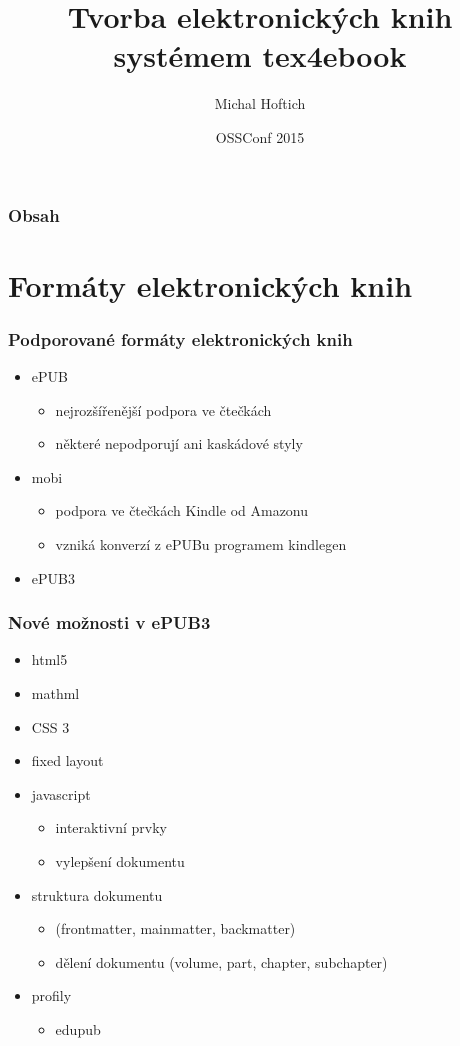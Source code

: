 \documentclass[czech]{beamer}
\title{Tvorba elektronických knih systémem tex4ebook}
\author{Michal Hoftich\inst{1}}
\institute{
  \inst{1}
  <\url{michal.h21@gmail.com}>\\
  Ústřední knihovna PedF UK
}
\date{OSSConf 2015}
\begin{document}
\frame{\titlepage}

\begin{frame}
  \frametitle{Obsah}
  \tableofcontents
\end{frame}

\section{Formáty elektronických knih}
\begin{frame}
\frametitle{Podporované formáty elektronických knih}
  \begin{itemize}%
\item ePUB 
  \begin{itemize}
    \item nejrozšířenější podpora ve čtečkách
    \item některé nepodporují ani kaskádové styly
  \end{itemize}
\item mobi
  \begin{itemize}
    \item podpora ve čtečkách Kindle od Amazonu
    \item vzniká konverzí z ePUBu programem kindlegen
  \end{itemize}
\item ePUB3
\end{itemize}
\end{frame}
\begin{frame}
  \frametitle{Nové možnosti v ePUB3}
  \begin{itemize}%
    \item  html5
    \item  mathml
    \item  CSS 3
    \item fixed layout
    \item  javascript
      \begin{itemize}
        \item  interaktivní prvky
        \item vylepšení dokumentu
      \end{itemize}
    \item  struktura dokumentu
      \begin{itemize}
        \item  (frontmatter, mainmatter, backmatter)
        \item  dělení dokumentu (volume, part, chapter, subchapter)
      \end{itemize}
     \item profily
       \begin{itemize}
     \item edupub
   \end{itemize}
\end{itemize}
\end{frame}
\end{document}
